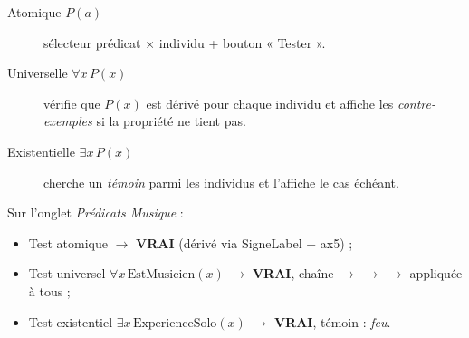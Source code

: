 \begin{description}
  \item[Atomique $P(a)$] sélecteur prédicat × individu + bouton « Tester ».
  \item[Universelle $\forall x\,P(x)$] vérifie que $P(x)$ est dérivé pour
        chaque individu et affiche les \emph{contre-exemples} si la propriété
        ne tient pas.
  \item[Existentielle $\exists x\,P(x)$] cherche un \emph{témoin} parmi les
        individus et l'affiche le cas échéant.
\end{description}

\begin{tcolorbox}[notebox, title={Exemple de session}]
Sur l'onglet \emph{Prédicats Musique} :
\begin{itemize}
  \item Test atomique  $\to$ \textbf{VRAI} (dérivé via
        SigneLabel + ax5) ;
  \item Test universel $\forall x\,\text{EstMusicien}(x)$ $\to$ \textbf{VRAI},
        chaîne  $\to$  $\to$
         $\to$  appliquée à tous ;
  \item Test existentiel $\exists x\,\text{ExperienceSolo}(x)$ $\to$
        \textbf{VRAI}, témoin : \emph{feu}.
\end{itemize}
\end{tcolorbox}
